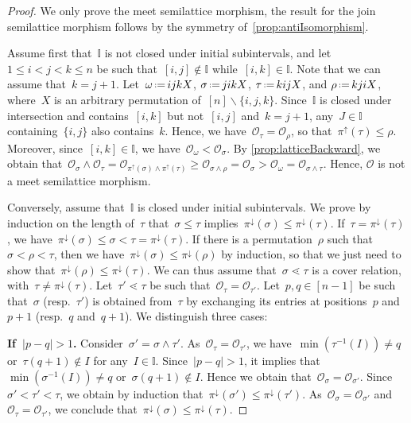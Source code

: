 \documentclass{amsart}
\theoremstyle{definition}
\newcommand{\ssm}{\smallsetminus} %
\newcommand{\eqdef}{\mbox{\,\raisebox{0.2ex}{\scriptsize\ensuremath{\mathrm:}}\ensuremath{=}\,}} %
\newcommand{\para}[1]{\medskip\noindent\textbf{#1}} %
\newcommand{\meet}{\wedge} %
\newcommand{\projDown}{\pi^\downarrow} %
\newcommand{\projUp}{\pi^\uparrow} %
\newcommand{\Or}{\mathcal O}  %
\newcommand{\II}{\mathbb I} %
\begin{document}
\begin{proof}
We only prove the meet semilattice morphism, the result for the join semilattice morphism follows by the symmetry of~\cref{prop:antiIsomorphism}.

Assume first that~$\II$ is not closed under initial subintervals, and let~$1 \le i < j < k \le n$ be such that~$[i,j] \notin \II$ while~$[i,k] \in \II$.
Note that we can assume that~$k = j+1$.
Let~$\omega \eqdef i j k X$, $\sigma \eqdef j i k X$, $\tau \eqdef k i j X$, and $\rho \eqdef k j i X$, where~$X$ is an arbitrary permutation of~$[n] \ssm \{i,j,k\}$.
Since~$\II$ is closed under intersection and contains~$[i,k]$ but not~$[i,j]$ and~$k = j+1$, any~$J \in \II$ containing~$\{i,j\}$ also contains~$k$.
Hence, we have~$\Or_\tau = \Or_\rho$, so that~$\projUp(\tau) \le \rho$.
Moreover, since~$[i,k] \in \II$, we have~${\Or_\omega < \Or_\sigma}$.
By \cref{prop:latticeBackward}, we obtain that~${\Or_\sigma \meet \Or_\tau = \Or_{\projUp(\sigma) \meet \projUp(\tau)} \ge \Or_{\sigma \meet \rho} = \Or_\sigma > \Or_\omega = \Or_{\sigma \meet \tau}}$.
Hence, $\Or$ is not a meet semilattice morphism.

Conversely, assume that~$\II$ is closed under initial subintervals.
We prove by induction on the length of~$\tau$ that~$\sigma \le \tau$ implies~$\projDown(\sigma) \le \projDown(\tau)$.
If~$\tau = \projDown(\tau)$, we have~$\projDown(\sigma) \le \sigma < \tau = \projDown(\tau)$. %
If there is a permutation~$\rho$ such that~$\sigma < \rho < \tau$, then we have~$\projDown(\sigma) \le \projDown(\rho)$ by induction, so that we just need to show that~$\projDown(\rho) \le \projDown(\tau)$.
We can thus assume that~$\sigma \lessdot \tau$ is a cover relation, with~$\tau \ne \projDown(\tau)$.
Let~$\tau' \lessdot \tau$ be such that~$\Or_\tau = \Or_{\tau'}$.
Let~$p,q \in [n-1]$ be such that~$\sigma$ (resp.~$\tau'$) is obtained from~$\tau$ by exchanging its entries at positions~$p$ and~$p+1$ (resp.~$q$ and~$q+1$).
We distinguish three cases:

\para{If~$|p-q| > 1$.} Consider~$\sigma' = \sigma \meet \tau'$. As~$\Or_\tau = \Or_{\tau'}$, we have~$\min(\tau^{-1}(I)) \ne q$ or~$\tau(q+1) \notin I$ for any~$I \in \II$.
Since~$|p-q| > 1$, it implies that~$\min(\sigma^{-1}(I)) \ne q$ or~$\sigma(q+1) \notin I$.
Hence we obtain that~$\Or_\sigma = \Or_{\sigma'}$.
Since~$\sigma' < \tau' < \tau$, we obtain by induction that~$\projDown(\sigma') \le \projDown(\tau')$.
As~$\Or_\sigma = \Or_{\sigma'}$ and~$\Or_\tau = \Or_{\tau'}$, we conclude that~$\projDown(\sigma) \le \projDown(\tau)$.


\end{proof}
\end{document}
